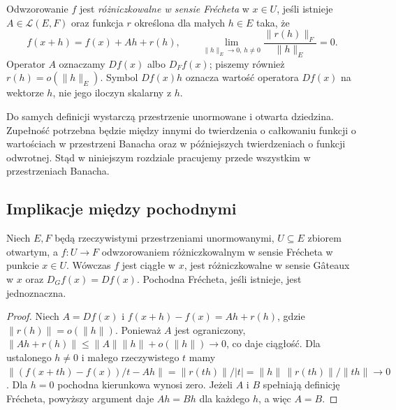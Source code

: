 \begin{definicja}
\label{def:frechet14}
Odwzorowanie $f$ jest \emph{różniczkowalne w sensie Frécheta} w $x\in U$, jeśli istnieje $A\in\mathcal L(E,F)$ oraz funkcja $r$ określona dla małych $h\in E$ taka, że
\[
f(x+h)=f(x)+Ah+r(h),\qquad
\lim_{\|h\|_E\to0,\,h\ne0}\frac{\|r(h)\|_F}{\|h\|_E}=0.
\]
Operator $A$ oznaczamy $Df(x)$ albo $D_Ff(x)$; piszemy również $r(h)=o(\|h\|_E)$. Symbol $Df(x)h$ oznacza wartość operatora $Df(x)$ na wektorze $h$, nie jego iloczyn skalarny z $h$.
\end{definicja}

\begin{uwaga}
\label{rem:completeness14}
Do samych definicji wystarczą przestrzenie unormowane i otwarta dziedzina. Zupełność potrzebna będzie między innymi do twierdzenia o całkowaniu funkcji o wartościach w przestrzeni Banacha oraz w późniejszych twierdzeniach o funkcji odwrotnej. Stąd w niniejszym rozdziale pracujemy przede wszystkim w przestrzeniach Banacha.
\end{uwaga}

\subsection{Implikacje między pochodnymi}

\begin{twierdzenie}
\label{thm:frechet-implies-gateaux14}
Niech $E,F$ będą rzeczywistymi przestrzeniami unormowanymi, $U\subseteq E$ zbiorem otwartym, a $f:U\to F$ odwzorowaniem różniczkowalnym w sensie Frécheta w punkcie $x\in U$. Wówczas $f$ jest ciągłe w $x$, jest różniczkowalne w sensie Gâteaux w $x$ oraz $D_Gf(x)=Df(x)$. Pochodna Frécheta, jeśli istnieje, jest jednoznaczna.
\end{twierdzenie}
\begin{proof}
Niech $A=Df(x)$ i $f(x+h)-f(x)=Ah+r(h)$, gdzie $\|r(h)\|=o(\|h\|)$. Ponieważ $A$ jest ograniczony, $\|Ah+r(h)\|\le\|A\|\|h\|+o(\|h\|)\to0$, co daje ciągłość. Dla ustalonego $h\ne0$ i małego rzeczywistego $t$ mamy
$\|(f(x+th)-f(x))/t-Ah\|=\|r(th)\|/|t|=\|h\|\,\|r(th)\|/\|th\|\to0$.
Dla $h=0$ pochodna kierunkowa wynosi zero. Jeżeli $A$ i $B$ spełniają definicję Frécheta, powyższy argument daje $Ah=Bh$ dla każdego $h$, a więc $A=B$.
\end{proof}

